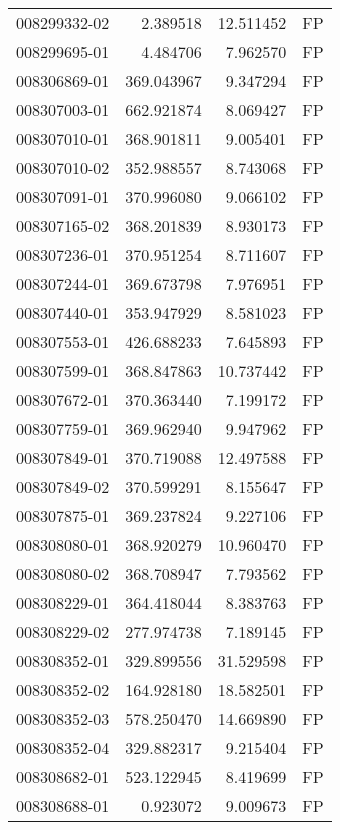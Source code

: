 \begin{tabular}{lrrl}
008299332-02 &    2.389518 &      12.511452 &   FP \\
008299695-01 &    4.484706 &       7.962570 &   FP \\
008306869-01 &  369.043967 &       9.347294 &   FP \\
008307003-01 &  662.921874 &       8.069427 &   FP \\
008307010-01 &  368.901811 &       9.005401 &   FP \\
008307010-02 &  352.988557 &       8.743068 &   FP \\
008307091-01 &  370.996080 &       9.066102 &   FP \\
008307165-02 &  368.201839 &       8.930173 &   FP \\
008307236-01 &  370.951254 &       8.711607 &   FP \\
008307244-01 &  369.673798 &       7.976951 &   FP \\
008307440-01 &  353.947929 &       8.581023 &   FP \\
008307553-01 &  426.688233 &       7.645893 &   FP \\
008307599-01 &  368.847863 &      10.737442 &   FP \\
008307672-01 &  370.363440 &       7.199172 &   FP \\
008307759-01 &  369.962940 &       9.947962 &   FP \\
008307849-01 &  370.719088 &      12.497588 &   FP \\
008307849-02 &  370.599291 &       8.155647 &   FP \\
008307875-01 &  369.237824 &       9.227106 &   FP \\
008308080-01 &  368.920279 &      10.960470 &   FP \\
008308080-02 &  368.708947 &       7.793562 &   FP \\
008308229-01 &  364.418044 &       8.383763 &   FP \\
008308229-02 &  277.974738 &       7.189145 &   FP \\
008308352-01 &  329.899556 &      31.529598 &   FP \\
008308352-02 &  164.928180 &      18.582501 &   FP \\
008308352-03 &  578.250470 &      14.669890 &   FP \\
008308352-04 &  329.882317 &       9.215404 &   FP \\
008308682-01 &  523.122945 &       8.419699 &   FP \\
008308688-01 &    0.923072 &       9.009673 &   FP \\

\end{tabular}

